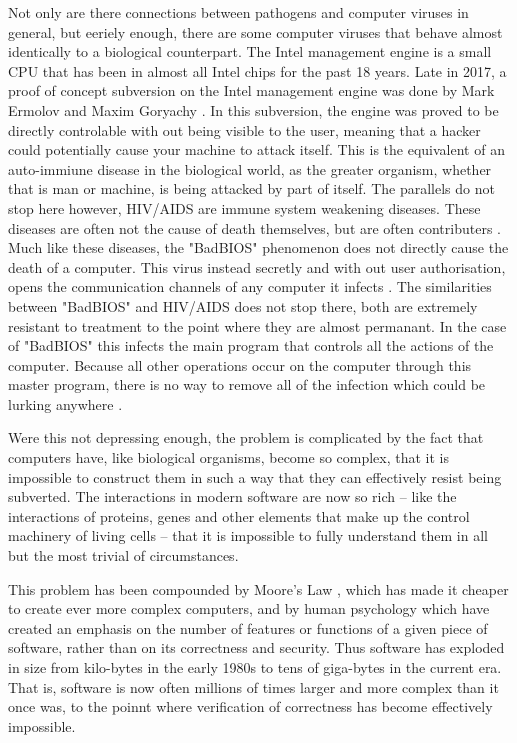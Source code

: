Not only are there connections between pathogens and computer viruses in general, but eeriely enough, there are some computer viruses that behave almost identically to a biological counterpart. The Intel management engine is a small CPU that has been in almost all Intel chips for the past 18 years. Late in 2017, a proof of concept subversion on the Intel management engine was done by  Mark Ermolov and Maxim Goryachy \cite{Hackaday}. In this subversion, the engine was proved to be directly controlable with out being visible to the user, meaning that a hacker could potentially cause your machine to attack itself. This is the equivalent of an auto-immiune disease in the biological world, as the greater organism, whether that is man or machine, is being attacked by part of itself. The parallels do not stop here however, HIV/AIDS are immune system weakening diseases. These diseases are often not the cause of death themselves, but are often contributers \cite{ggHIV}. Much like these diseases, the "BadBIOS" phenomenon does not directly cause the death of a computer. This virus instead secretly and with out user authorisation, opens the communication channels of any computer it infects \cite{Reference5}. The similarities between "BadBIOS" and HIV/AIDS does not stop there, both are extremely resistant to treatment to the point where they are almost permanant. In the case of "BadBIOS" this infects the main program that controls all the actions of the computer. Because all other operations occur on the computer through this master program, there is no way to remove all of the infection which could be lurking anywhere \cite{Reference5}.

Were this not depressing enough, the problem is complicated by the fact that computers have, like biological organisms,
become so complex, that it is impossible to construct them in such a way that they can effectively resist being subverted.
The interactions in modern software are now so rich -- like the interactions of proteins, genes and other elements that make up
the control machinery of living cells -- that it is impossible to fully understand them in all but the most trivial of circumstances.

This problem has been compounded by Moore's Law , which has made it cheaper to create ever more complex computers, and
by human psychology which have created an emphasis on the number of features or functions of a given piece of software, rather than
on its correctness and security.  Thus software has exploded in size from kilo-bytes in the early 1980s to tens of giga-bytes in
the current era. That is, software is now often millions of times larger and more complex than it once was, to the poinnt where
verification of correctness has become effectively impossible.

